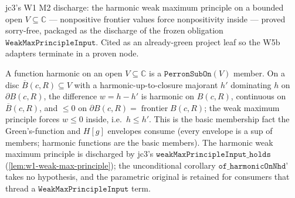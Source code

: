 \begin{lemma}
\label{lem:w1-weak-max-principle}
jc3's W1 M2 discharge: the harmonic weak maximum principle on a bounded
open \(V \subseteq \mathbb{C}\) — nonpositive frontier values force
nonpositivity inside — proved sorry-free, packaged as the discharge of the
frozen obligation \(\texttt{WeakMaxPrincipleInput}\).  Cited as an
already-green project leaf so the W5b adapters terminate in a proven node.
\leanok
\end{lemma}

\begin{lemma}
\label{lem:perron-sub-on-harmonic-member}
A function harmonic on an open \(V \subseteq \mathbb{C}\) is a
\(\texttt{PerronSubOn}(V)\) member.  On a disc \(\overline{B}(c,R) \subseteq V\)
with a harmonic-up-to-closure majorant \(h'\) dominating \(h\) on
\(\partial B(c,R)\), the difference \(w = h - h'\) is harmonic on
\(B(c,R)\), continuous on \(\overline{B}(c,R)\), and \(\le 0\) on
\(\partial B(c,R) = \operatorname{frontier} B(c,R)\); the weak maximum
principle forces \(w \le 0\) inside, i.e.\ \(h \le h'\).  This is the
basic membership fact the Green's-function and \(H[g]\) envelopes consume
(every envelope is a sup of members; harmonic functions are the basic
members).  The harmonic weak maximum principle is discharged by jc3's
\(\texttt{weakMaxPrincipleInput\_holds}\) (\ref{lem:w1-weak-max-principle});
the unconditional corollary \(\texttt{of\_harmonicOnNhd'}\) takes no
hypothesis, and the parametric original is retained for consumers that
thread a \(\texttt{WeakMaxPrincipleInput}\) term.
\leanok
\end{lemma}

